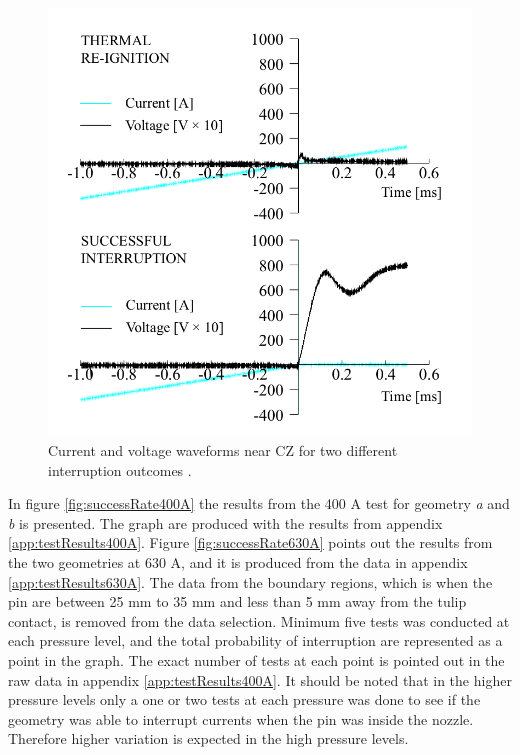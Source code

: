 \documentclass[10pt,a4paper,twoside]{article}
\begin{document}
\begin{figure}[H]
\centering
\includegraphics[scale=0.3]{Bilder/Results/differentInterruptions.png}
\caption{Current and voltage waveforms near CZ for two different interruption outcomes \cite{bib:AFIMVLBA}.} \label{fig:CurrentAndVoltageWaveform}
\end{figure}

In figure \ref{fig:successRate400A} the results from the 400 A test for geometry \textit{a} and \textit{b} is presented. The graph are produced with the results from appendix \ref{app:testResults400A}. Figure \ref{fig:successRate630A} points out the results from the two geometries at 630 A, and it is produced from the data in appendix \ref{app:testResults630A}. The data from the boundary regions, which is when the pin are between 25 mm to 35 mm and less than 5 mm away from the tulip contact, is removed from the data selection. Minimum five tests was conducted at each pressure level, and the total probability of interruption are represented as a point in the graph. The exact number of tests at each point is pointed out in the raw data in appendix \ref{app:testResults400A}. It should be noted that in the higher pressure levels only a one or two tests at each pressure was done to see if the geometry was able to interrupt currents when the pin was inside the nozzle. Therefore higher variation is expected in the high pressure levels.  
\end{document}

